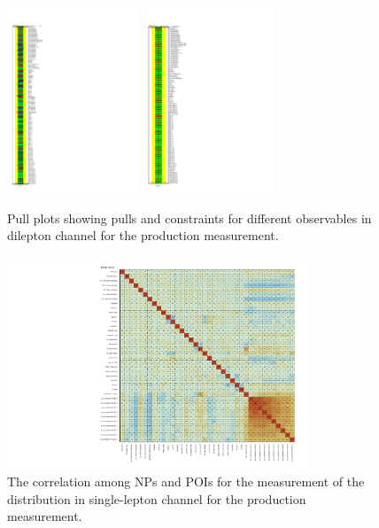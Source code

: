 \begin{figure}[ht]
  \centering
  \includegraphics[width=0.35\textwidth]{figures/diff_xsec/dilep_tty_prod_mu_blinded/compare_NP_pulls/compare_NP_dilep_fits_detall_dphill_eta/NuisPar_comp.pdf}
  \quad \quad
  \includegraphics[width=0.35\textwidth]{figures/diff_xsec/dilep_tty_prod_mu_blinded/compare_NP_pulls/compare_NP_dilep_fits_drphb_drlj/NuisPar_comp.pdf}
  \caption{Pull plots showing pulls and constraints for different observables in dilepton channel for the \tty production measurement.}
  \label{fig:pull_plot_pt_tty_dec_free_dilep_mu_blinded_2}
\end{figure}
\FloatBarrier



\begin{figure}[ht]
  \centering
  \includegraphics[width=0.8\textwidth]{figures/diff_xsec/ljet_tty_prod_mu_blinded/correlations/tty1l_pt_all_syst/CorrMatrix.pdf}
  \caption{The correlation among NPs and POIs for the measurement of the \ptgamma distribution in single-lepton channel for the \tty production measurement.}
  \label{fig:NP_corr_ljet_mu_blinded}
\end{figure}
\FloatBarrier


